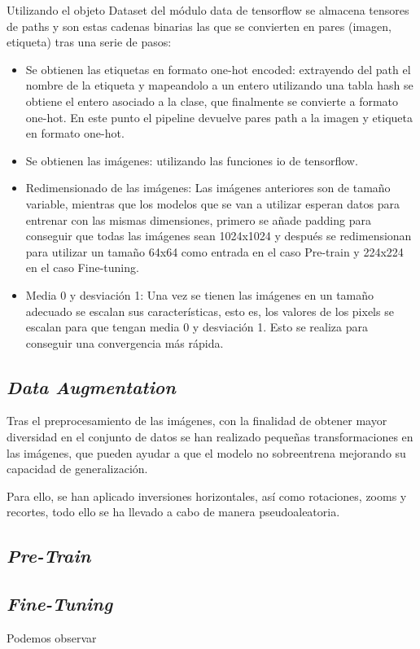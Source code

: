 Utilizando el objeto Dataset del módulo data de tensorflow se almacena tensores de paths y son estas cadenas binarias las que se convierten en pares (imagen, etiqueta) tras una serie de pasos:

\begin{itemize}
    \item Se obtienen las etiquetas en formato one-hot encoded: extrayendo del path el nombre de la etiqueta y mapeandolo a un entero utilizando una tabla hash se obtiene el entero asociado a la clase, que finalmente se convierte a formato one-hot. En este punto el pipeline devuelve pares path a la imagen y etiqueta en formato one-hot.

    \item Se obtienen las imágenes: utilizando las funciones io de tensorflow.

    \item Redimensionado de las imágenes: Las imágenes anteriores son de tamaño variable, mientras que los modelos que se van a utilizar esperan datos para entrenar con las mismas dimensiones, primero se añade padding para conseguir que todas las imágenes sean 1024x1024 y después se redimensionan para utilizar un tamaño 64x64 como entrada en el caso Pre-train y 224x224 en el caso Fine-tuning. 

    \item Media 0 y desviación 1: Una vez se tienen las imágenes en un tamaño adecuado se escalan sus características, esto es, los valores de los pixels se escalan para que tengan media 0 y desviación 1. Esto se realiza para conseguir una convergencia más rápida.

\end{itemize}

\subsection{\textit{Data Augmentation}}

Tras el preprocesamiento de las imágenes, con la finalidad de obtener mayor diversidad en el conjunto de datos se han realizado pequeñas transformaciones en las imágenes, que pueden ayudar a que el modelo no sobreentrena mejorando su capacidad de generalización.

Para ello, se han aplicado inversiones horizontales, así como rotaciones, zooms y recortes, todo ello se ha llevado a cabo de manera pseudoaleatoria.

\subsection{\textit{Pre-Train}}

\subsection{\textit{Fine-Tuning}}

\noindent
Podemos observar 


